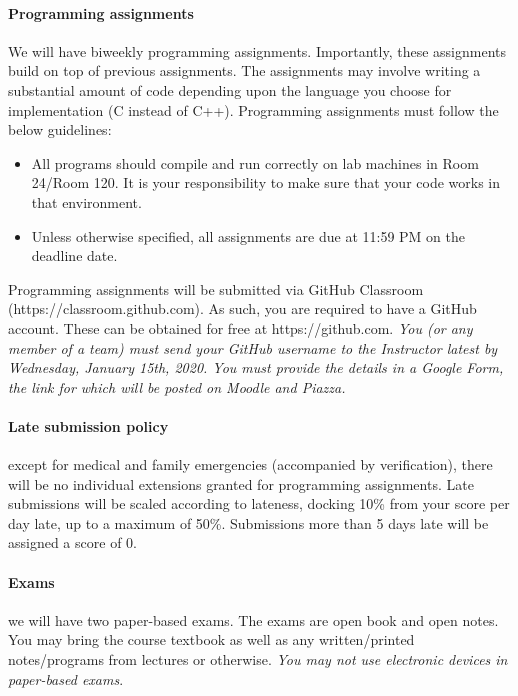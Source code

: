 \documentclass{article}
\begin{document}
\paragraph{Programming assignments} 
We will have biweekly programming assignments. 
Importantly, these assignments build on top of previous assignments. 
The assignments may involve writing a substantial amount of code depending upon the language you choose for implementation (C instead of C++). 
Programming assignments must follow the below guidelines:
\begin{itemize}
\item All programs should compile and run correctly on lab machines in Room 24/Room 120. It is your responsibility to make sure that your code works in that environment.
\item Unless otherwise specified, all assignments are due at 11:59 PM on the deadline date.
\end{itemize}

Programming assignments will be submitted via GitHub Classroom (https://classroom.github.com). As such, you are required to have a GitHub account. These can be obtained for free at https://github.com.
{\em You (or any member of a team) must send your GitHub username to the Instructor latest by Wednesday, January 15th, 2020. You must provide the details in a Google Form, the link for which will be posted on Moodle and Piazza. }

\paragraph{Late submission policy} except for medical and family emergencies (accompanied by verification), there will be no individual extensions granted for programming assignments. Late submissions will be scaled according to lateness, docking 10\% from your score per day late, up to a maximum of 50\%. Submissions more than 5 days late will be assigned a score of 0.

\paragraph{Exams} we will have two paper-based exams. 
The exams are open book and open notes. 
You may bring the course textbook as well as any written/printed notes/programs from lectures or otherwise. 
{\em You may not use electronic devices in paper-based exams}.
\end{document}
